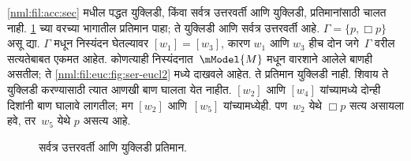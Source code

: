 \ref{nml:fil:acc:sec} मधील पद्धत युक्लिडी, किंवा
सर्वत्र उत्तरवर्ती आणि युक्लिडी, प्रतिमानांसाठी
चालत नाही. \ref{nml:fil:euc:fig:ser-eucl} च्या वरच्या भागातील
प्रतिमान पाहा; ते युक्लिडी आणि सर्वत्र उत्तरवर्ती आहे.
$\Gamma = \{p, \Box p \}$ असू द्या. $\Gamma$ मधून
निस्यंदन घेतल्यावर $[w_1] = [w_3]$, कारण $w_1$
आणि $w_3$ हीच दोन जगे~$\Gamma$ वरील सत्यतेबाबत
एकमत आहेत. कोणत्याही निस्यंदनात~$\mModel{M}$
मधून वारशाने आलेले बाणही असतील; ते
\ref{nml:fil:euc:fig:ser-eucl2} मध्ये दाखवले आहेत. ते प्रतिमान
युक्लिडी नाही. शिवाय ते युक्लिडी करण्यासाठी
त्यात आणखी बाण घालता येत नाहीत. $[w_2]$
आणि $[w_4]$ यांच्यामध्ये दोन्ही दिशांनी बाण
घालावे लागतील; मग $[w_2]$ आणि~$[w_5]$
यांच्यामध्येही. पण~$w_2$ येथे $\Box p$ सत्य
असायला हवे, तर~$w_5$ येथे $p$ असत्य आहे.

\begin{figure}[htpb]
  \centering
  \caption{सर्वत्र उत्तरवर्ती आणि युक्लिडी प्रतिमान.}
  \label{nml:fil:euc:fig:ser-eucl}
\end{figure}


